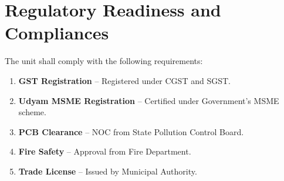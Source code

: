 \section*{Regulatory Readiness and Compliances}
The unit shall comply with the following requirements:
\begin{enumerate}
    \item \textbf{GST Registration} – Registered under CGST and SGST.
    \item \textbf{Udyam MSME Registration} – Certified under Government's MSME scheme.
    \item \textbf{PCB Clearance} – NOC from State Pollution Control Board.
    \item \textbf{Fire Safety} – Approval from Fire Department.
    \item \textbf{Trade License} – Issued by Municipal Authority.
\end{enumerate}